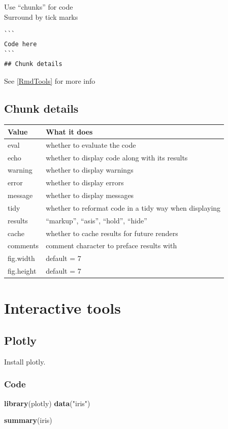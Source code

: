 \documentclass[
]{book}
\newenvironment{Shaded}{\begin{snugshade}}{\end{snugshade}}
\newcommand{\KeywordTok}[1]{\textcolor[rgb]{0.13,0.29,0.53}{\textbf{#1}}}
\newcommand{\NormalTok}[1]{#1}
\newcommand{\StringTok}[1]{\textcolor[rgb]{0.31,0.60,0.02}{#1}}
\begin{document}
Use ``chunks'' for code\\
Surround by tick marks

\begin{verbatim}
```
Code here   
```
## Chunk details
\end{verbatim}

See \ref{RmdTools} for more info

\hypertarget{chunk-details}{%
\section{Chunk details}\label{chunk-details}}

\begin{longtable}[]{@{}ll@{}}
\toprule
Value & What it does\tabularnewline
\midrule
\endhead
eval & whether to evaluate the code\tabularnewline
echo & whether to display code along with its results\tabularnewline
warning & whether to display warnings\tabularnewline
error & whether to display errors\tabularnewline
message & whether to display messages\tabularnewline
tidy & whether to reformat code in a tidy way when displaying\tabularnewline
results & ``markup'', ``asis'', ``hold'', ``hide''\tabularnewline
cache & whether to cache results for future renders\tabularnewline
comments & comment character to preface results with\tabularnewline
fig.width & default = 7\tabularnewline
fig.height & default = 7\tabularnewline
\bottomrule
\end{longtable}

\hypertarget{interactive-tools}{%
\chapter{Interactive tools}\label{interactive-tools}}

\hypertarget{plotly}{%
\section{Plotly}\label{plotly}}

Install plotly.

\hypertarget{code}{%
\subsection{Code}\label{code}}

\begin{Shaded}
\begin{Highlighting}[]
\KeywordTok{library}\NormalTok{(plotly)}
\KeywordTok{data}\NormalTok{(}\StringTok{"iris"}\NormalTok{)}

\KeywordTok{summary}\NormalTok{(iris)}
\end{Highlighting}
\end{Shaded}
\end{document}
